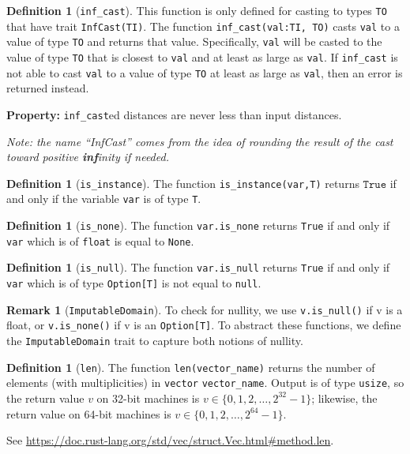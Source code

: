 \documentclass[11pt,a4paper]{article}
\theoremstyle{definition}
\newtheorem{remark}[theorem]{Remark}
\newtheorem{definition}[theorem]{Definition}
\newcommand{\True}{\texttt{True}}
\newcommand{\inRust}[2]{See \url{#2}.}
\begin{document}
\begin{definition}[\texttt{inf\_cast}]
\label{defn:inf-cast}
    This function is only defined for casting to types \texttt{TO} that have trait \texttt{InfCast(TI)}. The function \texttt{inf\_cast(val:TI, TO)} casts \texttt{val} to a value of type \texttt{TO} and returns that value. Specifically, \texttt{val} will be casted to the value of type \texttt{TO} that is closest to \texttt{val} and at least as large as \texttt{val}. If \texttt{inf\_cast} is not able to cast \texttt{val} to a value of type \texttt{TO} at least as large as \texttt{val}, then an error is returned instead.
    
    \textbf{Property:} \texttt{inf\_cast}ed distances are never less than input distances.
    
    \emph{Note: the name ``InfCast'' comes from the idea of rounding the result of the cast toward positive \textbf{inf}inity if needed.}
\end{definition}

\begin{definition}[\texttt{is\_instance}]
    The function \texttt{is\_instance(var,T)} returns $\True$ if and only if the variable \texttt{var} is of type \texttt{T}.
\end{definition}

\begin{definition}[\texttt{is\_none}]
    The function \texttt{var.is\_none} returns \texttt{True} if and only if \texttt{var} which is of \texttt{float} is equal to \texttt{None}.
\end{definition}

\begin{definition}[\texttt{is\_null}]
    The function \texttt{var.is\_null} returns \texttt{True} if and only if \texttt{var} which is of type \texttt{Option[T]} is not equal to \texttt{null}.
\end{definition}

\begin{remark}[\texttt{ImputableDomain}]
To check for nullity, we use \texttt{v.is\_null()} if v is a float, or \texttt{v.is\_none()} if v is an \texttt{Option[T]}. To abstract these functions, we define the \texttt{ImputableDomain} trait to capture both notions of nullity.
\end{remark}

\begin{definition}[\texttt{len}]
    The function \texttt{len(vector\_name)} returns the number of elements (with multiplicities) in \texttt{vector} \texttt{vector\_name}. Output is of type \texttt{usize}, so the return value $v$ on 32-bit machines is $v\in \{0,1,2,\ldots,2^{32} - 1\}$; likewise, the return value on 64-bit machines is $v\in \{0,1,2,\ldots,2^{64} - 1\}$. 
    
    \inRust{std::vec::Vec::len}{https://doc.rust-lang.org/std/vec/struct.Vec.html\#method.len}
\end{definition}
\end{document}
